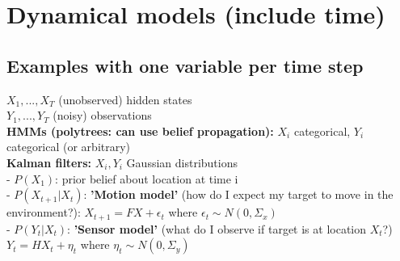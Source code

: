 \section{Dynamical models (include time)}

\subsection{Examples with one variable per time step}
$X_1, ...,X_T$ (unobserved) hidden states\\
$Y_1, ...,Y_T$ (noisy) observations\\
\textbf{HMMs (polytrees: can use belief propagation):} $X_i$ categorical, $Y_i$ categorical (or arbitrary)\\
\textbf{Kalman filters:} $X_i, Y_i$ Gaussian distributions\\
- $P(X_1)$: prior belief about location at time i\\
- $P(X_{t+1}|X_t)$: \textbf{'Motion model'} (how do I expect my target to move in the environment?): 
    $X_{t+1}=FX + \epsilon_t$ where $\epsilon_t \sim N(0, \Sigma_x)$\\
- $P(Y_t|X_t)$: \textbf{'Sensor model'} (what do I observe if target is at location $X_t$?)
    $Y_t=HX_t+\eta_t$ where $\eta_t\sim N(0, \Sigma_y)$

